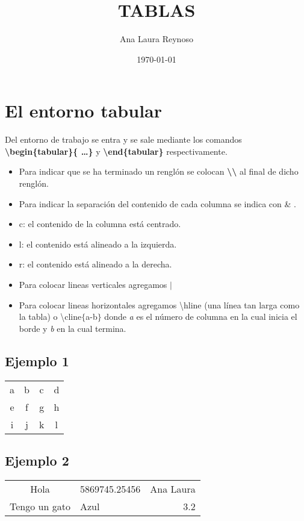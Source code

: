 \documentclass{article}
\title{TABLAS}
\author{Ana Laura Reynoso }
\date{\today} %
\begin{document}
\maketitle %

\section{El entorno tabular}
Del entorno de trabajo se entra y se sale mediante los comandos \textbf{\textbackslash begin\{tabular\}\{ \dots \}}  y \textbf{\textbackslash end\{tabular\}} respectivamente. 

\begin{itemize}
	\item Para indicar que se ha terminado un renglón se colocan \textbf{\textbackslash 						\textbackslash} al final de dicho renglón.
	\item Para indicar la separación del contenido de cada columna se indica con \& .
	\item c: el contenido de la columna está centrado.
	\item l: el contenido está alineado a la izquierda.
	\item r: el contenido está alineado a la derecha.
	\item Para colocar lineas verticales agregamos $\mid$ 
	\item Para colocar lineas horizontales agregamos \textbackslash hline (una línea tan larga 					como la tabla) o \textbackslash cline$\lbrace$a-b$\rbrace$ donde \textit{a} es el número de columna en la cual inicia el borde y \textit{b} en la cual termina.
	
\end{itemize}

\subsection{Ejemplo 1}
\begin{tabular}{c c c c}
	a & b & c & d \\
	e & f & g & h \\
	i & j & k & l
\end{tabular}

\subsection{Ejemplo 2}
\begin{tabular}{c l r}
  Hola & 5869745.25456 & Ana Laura \\
	Tengo un gato & Azul 		  & 3.2       \\
\end{tabular}
\end{document}
